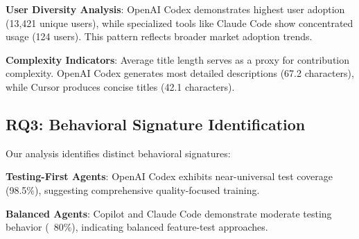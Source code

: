 \documentclass[conference]{IEEEtran}
\begin{document}
\textbf{User Diversity Analysis}: OpenAI Codex demonstrates highest user adoption (13,421 unique users), while specialized tools like Claude Code show concentrated usage (124 users). This pattern reflects broader market adoption trends.

\textbf{Complexity Indicators}: Average title length serves as a proxy for contribution complexity. OpenAI Codex generates most detailed descriptions (67.2 characters), while Cursor produces concise titles (42.1 characters).

\subsection{RQ3: Behavioral Signature Identification}

Our analysis identifies distinct behavioral signatures:

\textbf{Testing-First Agents}: OpenAI Codex exhibits near-universal test coverage (98.5\%), suggesting comprehensive quality-focused training.

\textbf{Balanced Agents}: Copilot and Claude Code demonstrate moderate testing behavior (~80\%), indicating balanced feature-test approaches.
\end{document}
